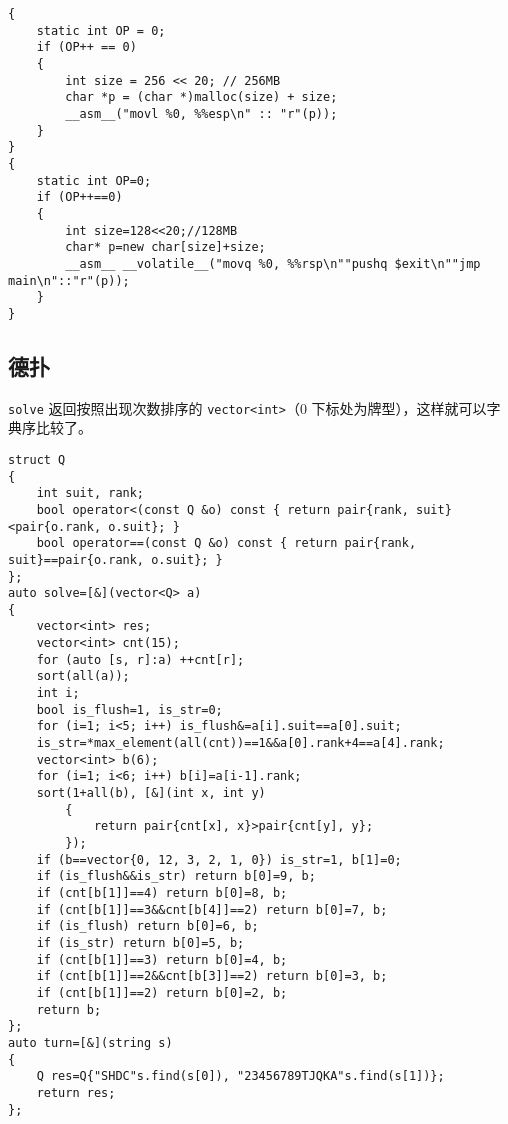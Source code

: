 \documentclass[12pt]{ctexart}
\begin{document}
\begin{lstlisting}
{
	static int OP = 0;
	if (OP++ == 0)
	{
		int size = 256 << 20; // 256MB
		char *p = (char *)malloc(size) + size;
		__asm__("movl %0, %%esp\n" :: "r"(p));
	}
}
{
	static int OP=0;
	if (OP++==0)
	{
		int size=128<<20;//128MB
		char* p=new char[size]+size;
		__asm__ __volatile__("movq %0, %%rsp\n""pushq $exit\n""jmp main\n"::"r"(p));
	}
}
\end{lstlisting}

\subsection{德扑}

\verb|solve| 返回按照出现次数排序的 \verb|vector<int>|（$0$ 下标处为牌型），这样就可以字典序比较了。

\begin{lstlisting}
struct Q
{
	int suit, rank;
	bool operator<(const Q &o) const { return pair{rank, suit}<pair{o.rank, o.suit}; }
	bool operator==(const Q &o) const { return pair{rank, suit}==pair{o.rank, o.suit}; }
};
auto solve=[&](vector<Q> a)
{
	vector<int> res;
	vector<int> cnt(15);
	for (auto [s, r]:a) ++cnt[r];
	sort(all(a));
	int i;
	bool is_flush=1, is_str=0;
	for (i=1; i<5; i++) is_flush&=a[i].suit==a[0].suit;
	is_str=*max_element(all(cnt))==1&&a[0].rank+4==a[4].rank;
	vector<int> b(6);
	for (i=1; i<6; i++) b[i]=a[i-1].rank;
	sort(1+all(b), [&](int x, int y)
		{
			return pair{cnt[x], x}>pair{cnt[y], y};
		});
	if (b==vector{0, 12, 3, 2, 1, 0}) is_str=1, b[1]=0;
	if (is_flush&&is_str) return b[0]=9, b;
	if (cnt[b[1]]==4) return b[0]=8, b;
	if (cnt[b[1]]==3&&cnt[b[4]]==2) return b[0]=7, b;
	if (is_flush) return b[0]=6, b;
	if (is_str) return b[0]=5, b;
	if (cnt[b[1]]==3) return b[0]=4, b;
	if (cnt[b[1]]==2&&cnt[b[3]]==2) return b[0]=3, b;
	if (cnt[b[1]]==2) return b[0]=2, b;
	return b;
};
auto turn=[&](string s)
{
	Q res=Q{"SHDC"s.find(s[0]), "23456789TJQKA"s.find(s[1])};
	return res;
};
\end{lstlisting}
\end{document}

